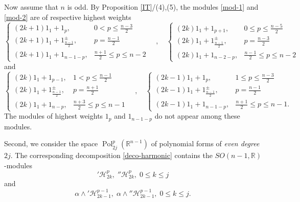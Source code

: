 \documentclass[a4paper,12pt,reqno]{amsart}
\numberwithin{theorem}{subsection}
\numberwithin{equation}{section}
\begin{document}
Now assume that $n$ is odd. By Proposition \ref{IT}/(4),(5), the modules
\eqref{mod-1} and \eqref{mod-2} are of respective highest weights
$$
   \begin{cases}
   (2k+1) 1_1 + 1_p, & 0 < p \le \frac{n-3}{2} \\
   (2k+1) 1_1 + 1_{\frac{n-1}{2}}^\pm, & p=\frac{n-1}{2} \\
   (2k+1) 1_1 + 1_{n-1-p}, & \frac{n+1}{2} \le p \le n-2
   \end{cases}
   \quad , \quad
   \begin{cases}
   (2k) 1_1 + 1_{p+1}, & 0 \le p \le \frac{n-5}{2} \\
   (2k) 1_1 + 1_{\frac{n-1}{2}}^\pm, & p= \frac{n-3}{2} \\
   (2k) 1_1 + 1_{n-2-p}, & \frac{n-1}{2} \le p \le n-2
   \end{cases}
$$
and
$$
   \begin{cases}
   (2k) 1_1 + 1_{p-1}, & 1 < p \le \frac{n-1}{2} \\
   (2k) 1_1 + 1_{\frac{n-1}{2}}^\pm, & p= \frac{n+1}{2} \\
   (2k) 1_1 + 1_{n-p}, & \frac{n+3}{2} \le p \le n-1
   \end{cases}
   \quad , \quad
   \begin{cases}
   (2k-1) 1_1 + 1_p, & 1 \le p \le \frac{n-3}{2} \\
   (2k-1) 1_1 + 1_{\frac{n-1}{2}}^\pm, & p= \frac{n-1}{2} \\
   (2k-1) 1_1 + 1_{n-1-p}, & \frac{n+1}{2} \le p \le n-1.
   \end{cases}
$$
The modules of highest weights $1_p$ and $1_{n-1-p}$ do not appear among these
modules.

Second, we consider the space ${\operatorname{Pol}}^p_{2j}({\mathbb{R}}^{n-1})$ of polynomial forms of
{\em even degree} $2j$. The corresponding decomposition \eqref{deco-harmonic}
contains the $SO(n-1,{\mathbb{R}})$-modules
\begin{equation}\label{mod-3}
   {'{\mathcal H}}_{2k}^p, \; {''{\mathcal H}}_{2k}^p, \; 0 \le k \le j
\end{equation}
and \begin{equation}\label{mod-4}
   \alpha \wedge {'{\mathcal H}}_{2k-1}^{p-1}, \; \alpha \wedge {''{\mathcal H}}_{2k-1}^{p-1}, \; 0 \le k \le j.
\end{equation}
\end{document}
